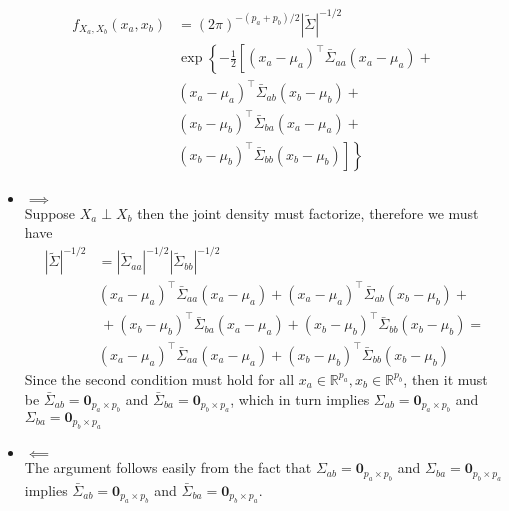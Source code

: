 \documentclass[10pt,notitlepage]{article}
\newcommand{\abs}[1]{\left\vert#1\right\vert}
\newcommand{\ZeroM}{\mathbf{0}}
\begin{document}
\begin{exercise}[Solution]
\begin{enumerate}[(a)]
\begin{align*}
                        f_{X_a,X_b}(x_a, x_b) &= \left(2\pi\right)^{-(p_a+p_b)/2}
                        \abs{\tilde{\Sigma}}^{-1/2}\\
                        &\exp\left\{-\frac{1}{2}\left[\left(x_a-\mu_a\right)^\top \bar{\Sigma}_{aa} \left(x_a-\mu_a\right)+\right.\right.\\
                        &\left(x_a-\mu_a\right)^\top \bar{\Sigma}_{ab} \left(x_b-\mu_b\right)+\\
                        &\left(x_b-\mu_b\right)^\top \bar{\Sigma}_{ba} \left(x_a-\mu_a\right)+\\
                        &\left.\left.\left(x_b-\mu_b\right)^\top \bar{\Sigma}_{bb} \left(x_b-\mu_b\right)\right]\right\}
                    \end{align*}
                    \begin{itemize}
                        \item $\implies$\\
                                Suppose $X_a\perp X_b$ then the joint density must factorize, therefore we must have
                                \begin{align*}
                                    \abs{\tilde{\Sigma}}^{-1/2} &= \abs{\tilde{\Sigma}_{aa}}^{-1/2}\abs{\tilde{\Sigma}_{bb}}^{-1/2}\\
                                    &\left(x_a-\mu_a\right)^\top \bar{\Sigma}_{aa} \left(x_a-\mu_a\right) + \left(x_a-\mu_a\right)^\top \bar{\Sigma}_{ab} \left(x_b-\mu_b\right)+\\
                                    &\,+\left(x_b-\mu_b\right)^\top \bar{\Sigma}_{ba} \left(x_a-\mu_a\right)+\left(x_b-\mu_b\right)^\top \bar{\Sigma}_{bb} \left(x_b-\mu_b\right) = \\
                                    &\left(x_a-\mu_a\right)^\top \bar{\Sigma}_{aa} \left(x_a-\mu_a\right) + \left(x_b-\mu_b\right)^\top \bar{\Sigma}_{bb} \left(x_b-\mu_b\right)
                                \end{align*}
                                Since the second condition must hold for all $x_a\in\mathbb{R}^{p_a}, x_b\in\mathbb{R}^{p_b}$, then it must be $\bar{\Sigma}_{ab} = \ZeroM_{p_a\times p_b}$ and $\bar{\Sigma}_{ba} = \ZeroM_{p_b\times p_a}$, which in turn implies $\Sigma_{ab} = \ZeroM_{p_a\times p_b}$ and $\Sigma_{ba} = \ZeroM_{p_b\times p_a}$
                        \item $\impliedby$\\
                                The argument follows easily from the fact that $\Sigma_{ab} = \ZeroM_{p_a\times p_b}$ and $\Sigma_{ba} = \ZeroM_{p_b\times p_a}$ implies $\bar{\Sigma}_{ab} = \ZeroM_{p_a\times p_b}$ and $\bar{\Sigma}_{ba} = \ZeroM_{p_b\times p_a}$.\\

\end{itemize}
\end{enumerate}
\end{exercise}
\end{document}
